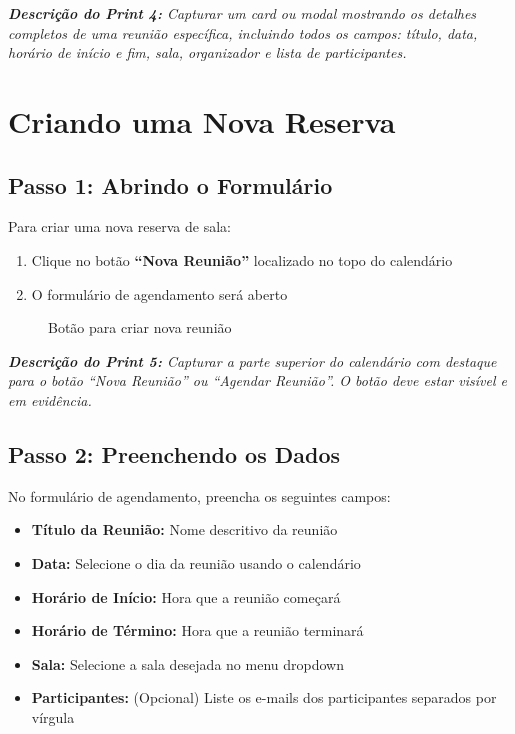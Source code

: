 \documentclass[12pt,a4paper]{article}
\begin{document}
\textit{\textbf{Descrição do Print 4:} Capturar um card ou modal mostrando os detalhes completos de uma reunião específica, incluindo todos os campos: título, data, horário de início e fim, sala, organizador e lista de participantes.}

\newpage

\section{Criando uma Nova Reserva}

\subsection{Passo 1: Abrindo o Formulário}

Para criar uma nova reserva de sala:

\begin{enumerate}[leftmargin=*]
    \item Clique no botão \textbf{``Nova Reunião''} localizado no topo do calendário
    \item O formulário de agendamento será aberto
\end{enumerate}

\begin{figure}[H]
    \centering
    \caption{Botão para criar nova reunião}
    \label{fig:botao_nova}
\end{figure}

\textit{\textbf{Descrição do Print 5:} Capturar a parte superior do calendário com destaque para o botão ``Nova Reunião'' ou ``Agendar Reunião''. O botão deve estar visível e em evidência.}

\subsection{Passo 2: Preenchendo os Dados}

No formulário de agendamento, preencha os seguintes campos:

\begin{itemize}[leftmargin=*]
    \item \textbf{Título da Reunião:} Nome descritivo da reunião
    \item \textbf{Data:} Selecione o dia da reunião usando o calendário
    \item \textbf{Horário de Início:} Hora que a reunião começará
    \item \textbf{Horário de Término:} Hora que a reunião terminará
    \item \textbf{Sala:} Selecione a sala desejada no menu dropdown
    \item \textbf{Participantes:} (Opcional) Liste os e-mails dos participantes separados por vírgula
\end{itemize}
\end{document}
